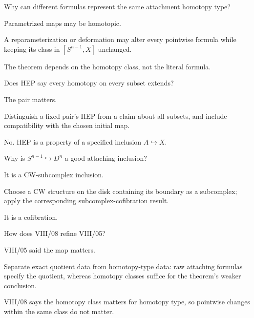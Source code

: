 \begin{exercise}\label{exr:viii08-18}
Why can different formulas represent the same attachment homotopy type?
\end{exercise}
\begin{hint}
Parametrized maps may be homotopic.

A reparameterization or deformation may alter every pointwise formula while keeping its class in \([S^{n-1},X]\) unchanged.
\end{hint}
\begin{solution}
The theorem depends on the homotopy class, not the literal formula.
\end{solution}

\begin{exercise}\label{exr:viii08-19}
Does HEP say every homotopy on every subset extends?
\end{exercise}
\begin{hint}
The pair matters.

Distinguish a fixed pair's HEP from a claim about all subsets, and include compatibility with the chosen initial map.
\end{hint}
\begin{solution}
No.  HEP is a property of a specified inclusion \(A\hookrightarrow X\).
\end{solution}

\begin{exercise}\label{exr:viii08-20}
Why is \(S^{n-1}\hookrightarrow D^n\) a good attaching inclusion?
\end{exercise}
\begin{hint}
It is a CW-subcomplex inclusion.

Choose a CW structure on the disk containing its boundary as a subcomplex; apply the corresponding subcomplex-cofibration result.
\end{hint}
\begin{solution}
It is a cofibration.
\end{solution}

\begin{exercise}\label{exr:viii08-21}
How does VIII/08 refine VIII/05?
\end{exercise}
\begin{hint}
VIII/05 said the map matters.

Separate exact quotient data from homotopy-type data: raw attaching formulas specify the quotient, whereas homotopy classes suffice for the theorem's weaker conclusion.
\end{hint}
\begin{solution}
VIII/08 says the homotopy class matters for homotopy type, so pointwise changes within the same class do not matter.
\end{solution}

